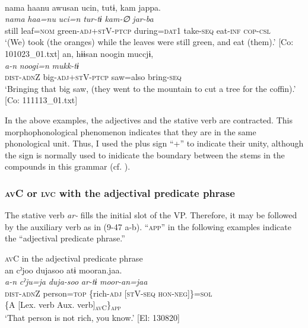 \ex{}\\
    \glll  nama  haanu  awusan  ucin,  tutɨ,  kam  jappa.\\
      \textit{nama}  \textit{haa=nu}  \textit{}  \textit{uci=n}  \textit{tur-tɨ}  \textit{kam-∅}  \textit{jar-ba}\\
      still  leaf=\textsc{nom}  green-\textsc{adj}+\textsc{st}V-\textsc{ptcp}  during=\textsc{dat}1  take-\textsc{seq}  eat-\textsc{inf}  \textsc{cop}-\textsc{csl}\\
      \glt       ‘(We) took (the oranges) while the leaves were still green, and eat (them).’ [Co: 101023\_01.txt]
\ex %
\glll an,  hɨɨsan  noogin  muccjɨ,\\
      \textit{a-n}  \textit{}  \textit{noogi=n}  \textit{mukk-tɨ}\\
      \textsc{dist}-\textsc{adn}Z  big-\textsc{adj}+\textsc{st}V-\textsc{ptcp}  saw=also  bring-\textsc{seq}\\
      \glt       ‘Bringing that big saw, (they went to the mountain to cut a tree for the coffin).’ [Co: 111113\_01.txt]
    \z
\z

In the above examples, the adjectives and the stative verb are contracted. This morphophonological phenomenon indicates that they are in the same phonological unit. Thus, I used the plus sign “+” to indicate their unity, although the sign is normally used to inidicate the boundary between the stems in the compounds in this grammar (cf. ).

\subsubsection{\textsc{av}C or \textsc{lvc} with the adjectival predicate phrase}\label{sec:9.2.2.3}

The stative verb \textit{ar-} fills the initial slot of the VP. Therefore, it may be followed by the auxiliary verb as in (9-47 a-b). “\textsc{app}” in the following examples indicate the “adjectival predicate phrase.”

\ea   \textsc{av}C in the adjectival predicate phrase \label{ex:9.47}
\ea\relax [= (8-48)]\\
    \gllll  an  cˀjoo  dujasoo  atɨ  mooran.jaa.\\
      \textit{a-n}  \textit{cˀju=ja}  \textit{duja-soo}  \textit{ar-tɨ}  \textit{moor-an=jaa}\\
      \textsc{dist}-\textsc{adn}Z  person=\textsc{top}  \{rich-\textsc{adj}  [\textsc{st}V-\textsc{seq}  \textsc{hon}-\textsc{neg}]\}=\textsc{sol}\\
          \{A  [Lex. verb  Aux. verb]\textsubscript{\textsc{av}C}\}\textsubscript{\textsc{app}}\\
      \glt       ‘That person is not rich, you know.’ [El: 130820]

